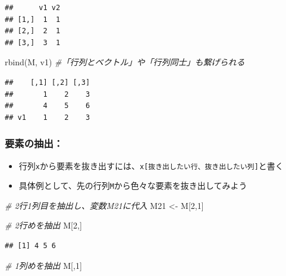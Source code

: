 \documentclass[
]{book}
\newenvironment{Shaded}{\begin{snugshade}}{\end{snugshade}}
\newcommand{\CommentTok}[1]{\textcolor[rgb]{0.56,0.35,0.01}{\textit{#1}}}
\newcommand{\DecValTok}[1]{\textcolor[rgb]{0.00,0.00,0.81}{#1}}
\newcommand{\FunctionTok}[1]{\textcolor[rgb]{0.00,0.00,0.00}{#1}}
\newcommand{\NormalTok}[1]{#1}
\newcommand{\OtherTok}[1]{\textcolor[rgb]{0.56,0.35,0.01}{#1}}
\providecommand{\tightlist}{%
  \setlength{\itemsep}{0pt}\setlength{\parskip}{0pt}}
\begin{document}
\begin{verbatim}
##      v1 v2
## [1,]  1  1
## [2,]  2  1
## [3,]  3  1
\end{verbatim}

\begin{Shaded}
\begin{Highlighting}[]
\FunctionTok{rbind}\NormalTok{(M, v1) }\CommentTok{\#「行列とベクトル」や「行列同士」も繋げられる}
\end{Highlighting}
\end{Shaded}

\begin{verbatim}
##    [,1] [,2] [,3]
##       1    2    3
##       4    5    6
## v1    1    2    3
\end{verbatim}

\hypertarget{ux8981ux7d20ux306eux62bdux51fa-1}{%
\subsubsection*{要素の抽出：}\label{ux8981ux7d20ux306eux62bdux51fa-1}}

\begin{itemize}
\tightlist
\item
  行列\texttt{x}から要素を抜き出すには、\texttt{x{[}抜き出したい行、抜き出したい列{]}}と書く
\item
  具体例として、先の行列\texttt{M}から色々な要素を抜き出してみよう
\end{itemize}

\begin{Shaded}
\begin{Highlighting}[]
\CommentTok{\# 2行1列目を抽出し、変数M21に代入}
\NormalTok{M21 }\OtherTok{\textless{}{-}}\NormalTok{ M[}\DecValTok{2}\NormalTok{,}\DecValTok{1}\NormalTok{]}

\CommentTok{\# 2行めを抽出}
\NormalTok{M[}\DecValTok{2}\NormalTok{,]}
\end{Highlighting}
\end{Shaded}

\begin{verbatim}
## [1] 4 5 6
\end{verbatim}

\begin{Shaded}
\begin{Highlighting}[]
\CommentTok{\# 1列めを抽出}
\NormalTok{M[,}\DecValTok{1}\NormalTok{]}
\end{Highlighting}
\end{Shaded}
\end{document}
